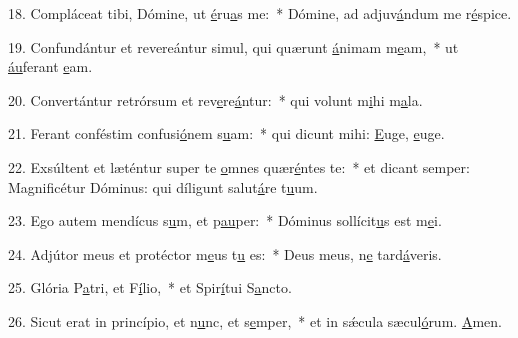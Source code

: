 18. Compláceat tibi, Dómine, ut \uline{é}ru\uline{a}s me:~* Dómine, ad adjuv\uline{á}ndum me r\uline{é}spice.\par 
19. Confundántur et revereántur simul, qui quærunt \uline{á}nimam m\uline{e}am,~* ut \uline{áu}ferant \uline{e}am.\par 
20. Convertántur retrórsum et rev\uline{e}re\uline{á}ntur:~* qui volunt m\uline{i}hi m\uline{a}la.\par 
21. Ferant conféstim confusi\uline{ó}nem s\uline{u}am:~* qui dicunt mihi: \uline{E}uge, \uline{e}uge.\par 
22. Exsúltent et læténtur super te \uline{o}mnes quær\uline{é}ntes te:~* et dicant semper: Magnificétur Dóminus: qui díligunt salut\uline{á}re t\uline{u}um.\par 
23. Ego autem mendícus s\uline{u}m, et p\uline{au}per:~* Dóminus sollícit\uline{u}s est m\uline{e}i.\par 
24. Adjútor meus et protéctor m\uline{e}us t\uline{u} es:~* Deus meus, n\uline{e} tard\uline{á}veris.\par 
25. Glória P\uline{a}tri, et F\uline{í}lio,~* et Spir\uline{í}tui S\uline{a}ncto.\par 
26. Sicut erat in princípio, et n\uline{u}nc, et s\uline{e}mper,~* et in sǽcula sæcul\uline{ó}rum. \uline{A}men.\par 
